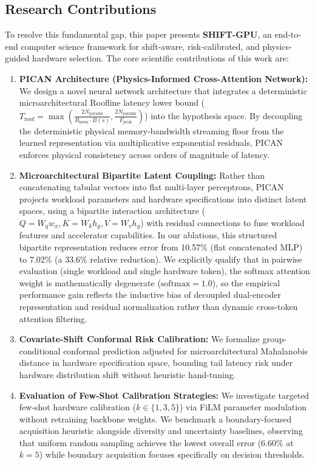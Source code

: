 \documentclass[preprint,12pt]{elsarticle}
\begin{document}
\subsection{Research Contributions}
To resolve this fundamental gap, this paper presents \textbf{SHIFT-GPU}, an end-to-end computer science framework for shift-aware, risk-calibrated, and physics-guided hardware selection. The core scientific contributions of this work are:

\begin{enumerate}
    \item \textbf{PICAN Architecture (Physics-Informed Cross-Attention Network):} We design a novel neural network architecture that integrates a deterministic microarchitectural Roofline latency lower bound ($T_{\text{roof}} = \max\left(\frac{2 N_{\text{params}}}{B_{\text{mem}} \cdot B(s)}, \frac{2 N_{\text{params}}}{F_{\text{peak}}}\right)$) into the hypothesis space. By decoupling the deterministic physical memory-bandwidth streaming floor from the learned representation via multiplicative exponential residuals, PICAN enforces physical consistency across orders of magnitude of latency.
    \item \textbf{Microarchitectural Bipartite Latent Coupling:} Rather than concatenating tabular vectors into flat multi-layer perceptrons, PICAN projects workload parameters and hardware specifications into distinct latent spaces, using a bipartite interaction architecture ($Q = W_q w_x, K = W_k h_g, V = W_v h_g$) with residual connections to fuse workload features and accelerator capabilities. In our ablations, this structured bipartite representation reduces error from 10.57\% (flat concatenated MLP) to 7.02\% (a 33.6\% relative reduction). We explicitly qualify that in pairwise evaluation (single workload and single hardware token), the softmax attention weight is mathematically degenerate ($\mathrm{softmax}=1.0$), so the empirical performance gain reflects the inductive bias of decoupled dual-encoder representation and residual normalization rather than dynamic cross-token attention filtering.
    \item \textbf{Covariate-Shift Conformal Risk Calibration:} We formalize group-conditional conformal prediction adjusted for microarchitectural Mahalanobis distance in hardware specification space, bounding tail latency risk under hardware distribution shift without heuristic hand-tuning.
    \item \textbf{Evaluation of Few-Shot Calibration Strategies:} We investigate targeted few-shot hardware calibration ($k \in \{1, 3, 5\}$) via FiLM parameter modulation without retraining backbone weights. We benchmark a boundary-focused acquisition heuristic alongside diversity and uncertainty baselines, observing that uniform random sampling achieves the lowest overall error (6.60\% at $k=5$) while boundary acquisition focuses specifically on decision thresholds.

\end{enumerate}
\end{document}
